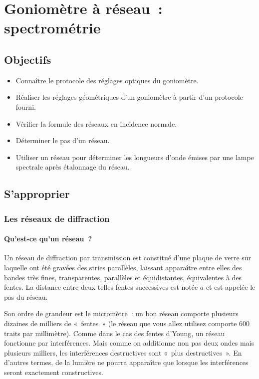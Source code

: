 \documentclass[a4paper, 12pt, final, garamond]{book}
\begin{document}
\setcounter{chapter}{3}

\chapter{Goniom\`etre \`a r\'eseau~: spectrom\'etrie}

\section{Objectifs}

\begin{itemize}
    \item Connaître le protocole des réglages optiques du goniomètre.
    \item Réaliser les réglages géométriques d'un goniomètre à partir d'un
        protocole fourni.
    \item Vérifier la formule des réseaux en incidence normale.
    \item Déterminer le pas d'un réseau.
    \item Utiliser un réseau pour déterminer les longueurs d'onde émises par une
        lampe spectrale après étalonnage du réseau.
\end{itemize}


\section{S'approprier}
\subsection{Les réseaux de diffraction} 

\subsubsection{Qu'est-ce qu'un réseau~?}

Un réseau de diffraction par transmission est constitué d'une plaque de verre
sur laquelle ont été gravées des stries parallèles, laissant apparaître entre
elles des bandes très fines, transparentes, parallèles et équidistantes,
équivalentes à des fentes. La distance entre deux telles fentes successives est
notée $a$ et est appelée le pas du réseau. 

Son ordre de grandeur est le micromètre~: un bon réseau comporte plusieurs
dizaines de milliers de «~fentes~» (le réseau que vous allez utilisez comporte
600 traits par millimètre). Comme dans le cas des fentes d'Young, un réseau
fonctionne par interférences. Mais comme on additionne non pas deux ondes mais
plusieurs milliers, les interférences destructives sont «~plus destructives~».
En d'autres termes, de la lumière ne pourra apparaître que lorsque les
interférences seront exactement constructives. 
\end{document}
